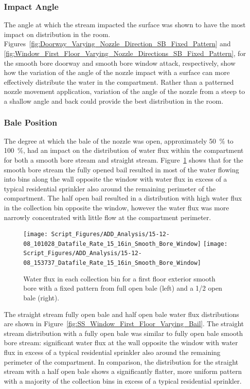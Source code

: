 \documentclass[12pt,oneside]{book}
\begin{document}
\clearpage

\subsubsection{Impact Angle}
The angle at which the stream impacted the surface was shown to have the most impact on distribution in the room. Figures~\ref{fig:Doorway_Varying_Nozzle_Direction_SB_Fixed_Pattern} and \ref{fig:Window_First_Floor_Varying_Nozzle_Directions_SB_Fixed_Pattern}, for the smooth bore doorway and smooth bore window attack, respectively, show how the variation of the angle of the nozzle impact with a surface can more effectively distribute the water in the compartment. Rather than a patterned nozzle movement application, variation of the angle of the nozzle from a steep to a shallow angle and back could provide the best distribution in the room.  

\subsubsection{Bale Position}
The degree at which the bale of the nozzle was open, approximately 50~\% to 100~\%, had an impact on the distribution of water flux within the compartment for both a smooth bore stream and straight stream. Figure~\ref{fig:SB_Window_First_Floor_Varying_Bail} shows that for the smooth bore stream the fully opened bail resulted in most of the water flowing into bins along the wall opposite the window with water flux in excess of a typical residential sprinkler also around the remaining perimeter of the compartment. The half open bail resulted in a distribution with high water flux in the collection bin opposite the window, however the water flux was more narrowly concentrated with little flow at the compartment perimeter. 

\begin{figure}[ht]
\texttt{[image: Script\_Figures/ADD\_Analysis/15-12-08\_101028\_Datafile\_Rate\_15\_16in\_Smooth\_Bore\_Window]}
\texttt{[image: Script\_Figures/ADD\_Analysis/15-12-08\_153737\_Datafile\_Rate\_15\_16in\_Smooth\_Bore\_Window]} \\ 
\caption[Water Flux Varying Bale Opening Smooth Bore]{Water flux in each collection bin for a first floor exterior smooth bore with a fixed pattern from full open bale (left) and a 1/2 open bale (right).}
\label{fig:SB_Window_First_Floor_Varying_Bail}
\end{figure}

The straight stream fully open bale and half open bale water flux distributions are shown in Figure~\ref{fig:SS_Window_First_Floor_Varying_Bail}. The straight stream distribution with a fully open bale was similar to fully open bale smooth bore stream: significant water flux at the wall opposite the window with water flux in excess of a typical residential sprinkler also around the remaining perimeter of the compartment. In comparison, the distribution for the straight stream with a half open bale shows a significantly flatter, more uniform pattern with a majority of the collection bins in excess of a typical residential sprinkler.
\end{document}
